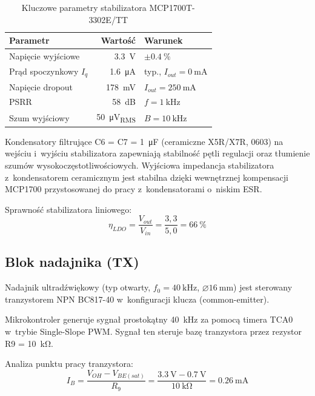 \documentclass[a4paper,11pt]{article}
\begin{document}
\begin{table}[H]
    \centering
    \caption{Kluczowe parametry stabilizatora MCP1700T-3302E/TT}
    \label{tab:mcp1700}
    \begin{tabular}{lrl}
        \toprule
        \textbf{Parametr} & \textbf{Wartość} & \textbf{Warunek} \\
        \midrule
        Napięcie wyjściowe & \SI{3,3}{\volt} & $\pm\SI{0,4}{\percent}$ \\
        Prąd spoczynkowy $I_q$ & \SI{1,6}{\micro\ampere} & typ., $I_{out} = \SI{0}{\milli\ampere}$ \\
        Napięcie dropout & \SI{178}{\milli\volt} & $I_{out} = \SI{250}{\milli\ampere}$ \\
        PSRR & \SI{58}{\deci\bel} & $f = \SI{1}{\kilo\hertz}$ \\
        Szum wyjściowy & \SI{50}{\micro\volt_{RMS}} & $B = \SI{10}{\kilo\hertz}$ \\
        \bottomrule
    \end{tabular}
\end{table}

Kondensatory filtrujące C6 = C7 = \SI{1}{\micro\farad} (ceramiczne X5R/X7R, 0603)
na wejściu i~wyjściu stabilizatora zapewniają stabilność pętli regulacji
oraz tłumienie szumów wysokoczęstotliwościowych. Wyjściowa impedancja
stabilizatora z~kondensatorem ceramicznym jest stabilna dzięki wewnętrznej
kompensacji MCP1700 przystosowanej do pracy z~kondensatorami o~niskim ESR.

Sprawność stabilizatora liniowego:
\begin{equation}
    \eta_{LDO} = \frac{V_{out}}{V_{in}} = \frac{3{,}3}{5{,}0} = \SI{66}{\percent}
    \label{eq:sprawnosc_ldo}
\end{equation}

\subsection{Blok nadajnika (TX)}
\label{sec:nadajnik}

Nadajnik ultradźwiękowy (typ otwarty, $f_0 = \SI{40}{\kilo\hertz}$,
$\varnothing\SI{16}{\milli\metre}$) jest sterowany tranzystorem NPN BC817-40
w~konfiguracji klucza (common-emitter).

Mikrokontroler generuje sygnał prostokątny \SI{40}{\kilo\hertz} za pomocą
timera TCA0 w~trybie Single-Slope PWM. Sygnał ten steruje bazę tranzystora
przez rezystor R9 = \SI{10}{\kilo\ohm}.

Analiza punktu pracy tranzystora:
\begin{equation}
    I_B = \frac{V_{OH} - V_{BE(sat)}}{R_9} = \frac{\SI{3,3}{\volt} - \SI{0,7}{\volt}}{\SI{10}{\kilo\ohm}} = \SI{0,26}{\milli\ampere}
    \label{eq:ib}
\end{equation}
\end{document}
